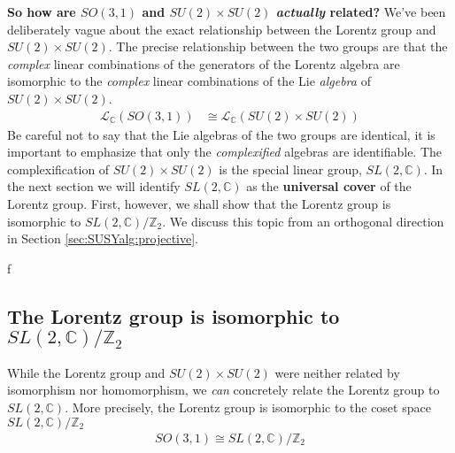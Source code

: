 \documentclass[12pt]{article}
\numberwithin{equation}{section}    %
\begin{document}
\vspace{.5em}
\begin{framed}
	\noindent\textbf{So how are $SO(3,1)$ and $SU(2)\times SU(2)$ \textit{actually} related?} We've been deliberately vague about the exact relationship between the Lorentz group and $SU(2)\times SU(2)$. The precise relationship between the two groups are that the \textit{complex} linear combinations of the generators of the Lorentz algebra are isomorphic to the \textit{complex} linear combinations of the Lie \textit{algebra} of $SU(2)\times SU(2)$. 
	\begin{align}
		\mathcal L_{\mathbb{C}}(SO(3,1)) &\cong \mathcal L_{\mathbb{C}}(SU(2)\times SU(2))
	\end{align}
	Be careful not to say that the Lie algebras of the two groups are identical, it is important to emphasize that only the \textit{complexified} algebras are identifiable. 
	The complexification of $SU(2)\times SU(2)$ is the special linear group, $SL(2,\mathbb C)$. In the next section we will identify $SL(2,\mathbb C)$ as the \textbf{universal cover} of the Lorentz group. First, however, we shall show that the Lorentz group is isomorphic to $SL(2,\mathbb C)/\mathbb{Z}_2$. We discuss this topic from an orthogonal direction in Section \ref{sec:SUSYalg:projective}.
\end{framed}f
\vspace{.5em}


\subsection{\texorpdfstring{The Lorentz group is isomorphic to $SL(2,\mathbb{C})/\mathbb{Z}_2$}{The Lorentz group is isomorphic to SL(2,C)/Z2}}

While the Lorentz group and $SU(2)\times SU(2)$ were neither related by isomorphism nor homomorphism, we \textit{can} concretely relate the Lorentz group to $SL(2,\mathbb{C})$. More precisely, the Lorentz group is isomorphic to the coset space $SL(2,\mathbb{C})/\mathbb{Z}_2$
\begin{align}
	SO(3,1) \cong SL(2,\mathbb{C})/\mathbb{Z}_2
\end{align}
\end{document}
